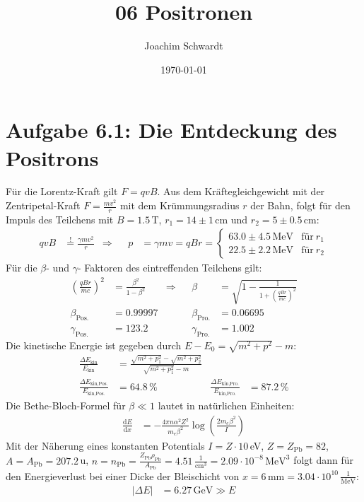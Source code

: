 \documentclass[a4paper,12pt]{article}
\newcommand{\kla}{}
\newcommand{\tecxt}{}
\begin{document}
\title{06 Positronen}
\author{Joachim Schwardt}
\date{\today}
\maketitle

\section*{Aufgabe 6.1: Die Entdeckung des Positrons}
Für die Lorentz-Kraft gilt $F=qvB$. Aus dem Kräftegleichgewicht mit der Zentripetal-Kraft $F=\frac{mv^2}{r}$ mit dem Krümmungsradius $r$ der Bahn, folgt für den Impuls des Teilchens mit $B=1.5\,$T, $r_1=14\pm 1\,$cm und $r_2=5\pm 0.5\,$cm:
\begin{align*}
qvB&\overset{!}{=}\frac{\gamma mv^2}{r}&\Rightarrow &&p&=\gamma mv=qBr=\left\{\begin{matrix}
63.0\pm 4.5\,\tecxt\text{MeV} & \tecxt\text{für}\ r_1 \\ 22.5\pm 2.2\,\tecxt\text{MeV} & \tecxt\text{für}\ r_2
\end{matrix}\right.
\end{align*}
Für die $\beta$- und $\gamma$- Faktoren des eintreffenden Teilchens gilt:
\begin{align*}
\kla\left( {\frac{qBr}{mc}} \right)^2&=\frac{\beta^2}{1-\beta^2}&\Rightarrow && \beta&=\sqrt{1-\frac{1}{1+\kla\left( {\frac{qBr}{mc}} \right)^2}}\\
\beta_\tecxt\text{Pos.}&=0.99997&&&\beta_\tecxt\text{Pro.}&=0.06695\\
\gamma_\tecxt\text{Pos.}&=123.2 &&&\gamma_\tecxt\text{Pro.}&=1.002
\end{align*}
Die kinetische Energie ist gegeben durch $E-E_0=\sqrt{m^2+p^2}-m$:
\begin{align*}
\frac{\Delta E_\tecxt\text{kin}}{E_\tecxt\text{kin}}&=\frac{\sqrt{m^2+p_1^2}-\sqrt{m^2+p_2^2}}{\sqrt{m^2+p_1^2}-m}\\
\frac{\Delta E_\tecxt\text{kin,Pos.}}{E_\tecxt\text{kin,Pos.}}&=64.8\,\%&\frac{\Delta E_\tecxt\text{kin,Pro.}}{E_\tecxt\text{kin,Pro.}}&=87.2\,\%
\end{align*}
Die Bethe-Bloch-Formel für $\beta\ll 1$ lautet in natürlichen Einheiten:
\begin{align*}
\frac{\tecxt\text{d}E}{\tecxt\text{d}x}&=-\frac{4\pi n\alpha^2Z^2}{m_e\beta^2}\log\kla\left( {\frac{2m_e\beta^2}{I}} \right)
\end{align*}
Mit der Näherung eines konstanten Potentials $I=Z\cdot 10\,$eV, $Z=Z_\tecxt\text{Pb}=82$, $A=A_\tecxt\text{Pb}=207.2\,$u, $n=n_\tecxt\text{Pb}=\frac{Z_\tecxt\text{Pb}\rho_\tecxt\text{Pb}}{A_\tecxt\text{Pb}}=4.51\,\frac{1}{\tecxt\text{cm}^3}=2.09\cdot 10^{-8}\,\tecxt\text{MeV}^3$ folgt dann für den Energieverlust bei einer Dicke der Bleischicht von $x=6\,\tecxt\text{mm}=3.04\cdot 10^{10}\,\frac{1}{\tecxt\text{MeV}}$:
\begin{align*}
|\Delta E|&=6.27\,\tecxt\text{GeV}\gg E
\end{align*}
\end{document}
